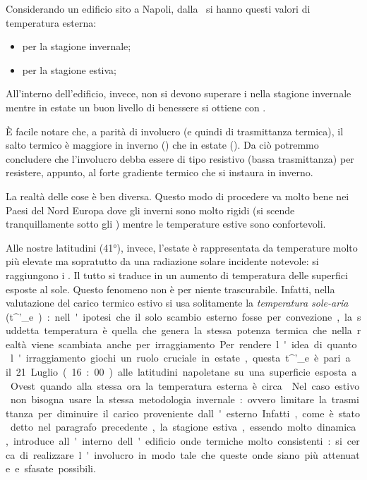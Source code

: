 Considerando un edificio sito a Napoli, dalla \norvent\ si hanno questi valori di temperatura esterna:
\begin{itemize}
	\item {} per la stagione invernale;
	\item {} per la stagione estiva;
\end{itemize}
All'interno dell'edificio, invece, non si devono superare i  nella stagione invernale mentre in estate un buon livello di benessere si ottiene con .

È facile notare che, a parità di involucro (e quindi di trasmittanza termica), il salto termico è maggiore in inverno () che in estate (). Da ciò potremmo concludere che l'involucro debba essere di tipo resistivo (bassa trasmittanza) per resistere, appunto, al forte gradiente termico che si instaura in inverno. 

La realtà delle cose è ben diversa. Questo modo di procedere va molto bene nei Paesi del Nord Europa dove gli inverni sono molto rigidi (si scende tranquillamente sotto gli ) mentre le temperature estive sono confortevoli.

Alle nostre latitudini (\ang{41}), invece, l'estate è rappresentata da temperature molto più elevate ma sopratutto da una radiazione solare incidente notevole: si raggiungono i . Il tutto si traduce in un aumento di temperatura delle superfici esposte al sole. Questo fenomeno non è per niente trascurabile. Infatti, nella valutazione del carico termico estivo si usa solitamente la \emph{temperatura sole-aria} (\si{t^'_e}): nell'ipotesi che il solo scambio esterno fosse per convezione, la suddetta temperatura è quella che genera la stessa potenza termica che nella realtà viene scambiata anche per irraggiamento.

Per rendere l'idea di quanto l'irraggiamento giochi un ruolo cruciale in estate, questa \si{t^'_e} è pari a  il 21 Luglio (16:00) alle latitudini napoletane su una superficie esposta a Ovest quando alla stessa ora la temperatura esterna è circa . 

Nel caso estivo non bisogna usare la stessa metodologia invernale: ovvero limitare la trasmittanza per diminuire il carico proveniente dall'esterno. Infatti, come è stato detto nel paragrafo precedente, la stagione estiva, essendo molto dinamica, introduce all'interno dell'edificio onde termiche molto consistenti: si cerca di realizzare l'involucro in modo tale che queste onde siano più attenuate e sfasate possibili.

